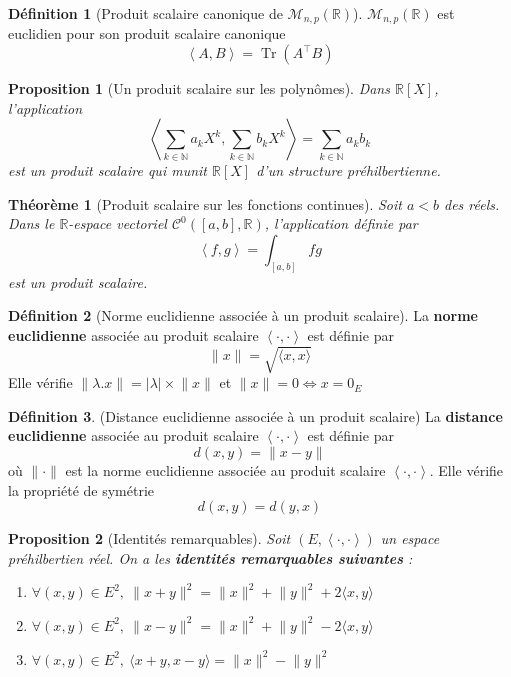 \documentclass[french]{book}
\newcommand{\N}{\mathbb{N}}
\newcommand{\R}{\mathbb{R}}
\theoremstyle{plain}
\newtheorem{thm}{Théorème}[chapter]
\newtheorem{prop}{Proposition}[chapter]
\theoremstyle{definition}
\newtheorem{dfn}{Définition}[chapter]
\theoremstyle{remark}
\DeclareMathOperator{\tr}{Tr}
\begin{document}
\begin{dfn}[Produit scalaire canonique de $\mathcal{M}_{n,p}(\R)$]
	$\mathcal{M}_{n,p}(\R)$ est euclidien pour son produit scalaire canonique $$\left\langle A,B\right\rangle =\tr(A^\top B)$$
\end{dfn}
\begin{prop}[Un produit scalaire sur les polynômes]
	Dans $\R[X]$, l'application $$\left\langle \sum_{k\in\N}a_kX^k,\sum_{k\in\N}b_kX^k\right\rangle = \sum_{k\in\N}a_kb_k$$ est un produit scalaire qui munit $\R[X]$ d'un structure préhilbertienne.
\end{prop}
\begin{thm}[Produit scalaire sur les fonctions continues]
	Soit $a<b$ des réels. Dans le $\R$-espace vectoriel $\mathcal{C}^0([a,b],\R)$, l'application définie par $$\left\langle f,g\right\rangle = \int_{[a,b]} fg$$ est un produit scalaire.
\end{thm}
\begin{dfn}[Norme euclidienne associée à un produit scalaire]
	La \textbf{norme euclidienne} associée au produit scalaire $\left\langle\cdot,\cdot\right\rangle$ est définie par $$\lVert x\rVert=\sqrt{\langle x,x\rangle}$$ Elle vérifie $\lVert \lambda.x\rVert=\lvert\lambda\rvert\times\lVert x\rVert$ et $\lVert x\rVert =0 \iff x=0_E$
\end{dfn}
\begin{dfn}(Distance euclidienne associée à un produit scalaire)
	La \textbf{distance euclidienne} associée au produit scalaire $\left\langle\cdot,\cdot\right\rangle$ est définie par $$d(x,y)=\lVert x-y\rVert$$ où $\lVert\cdot\rVert$ est la norme euclidienne associée au produit scalaire $\left\langle\cdot,\cdot\right\rangle$. Elle vérifie la propriété de symétrie $$d(x,y)=d(y,x)$$
\end{dfn}
\begin{prop}[Identités remarquables]
	Soit $(E,\left\langle\cdot,\cdot\right\rangle)$ un espace préhilbertien réel. On a les \textbf{identités remarquables suivantes} :
	\begin{enumerate}
		\item $\forall (x,y)\in E^2,\ \lVert x+y\rVert^2=\lVert x\rVert^2+\lVert y\rVert^2+2\langle x,y\rangle$
		\item $\forall (x,y)\in E^2,\ \lVert x-y\rVert^2=\lVert x\rVert^2+\lVert y\rVert^2-2\langle x,y\rangle$
		\item $\forall (x,y)\in E^2,\ \langle x+y,x-y\rangle=\lVert x\rVert^2-\lVert y\rVert^2$
	\end{enumerate}
\end{prop}
\end{document}
